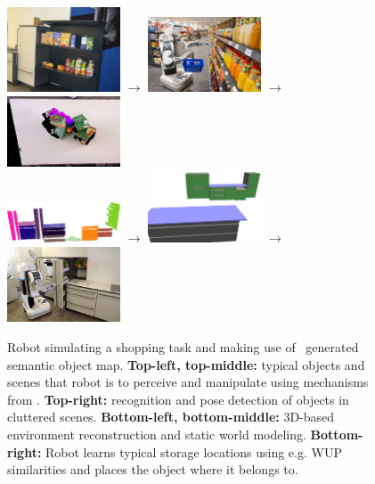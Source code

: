 \begin{figure}
  \begin{centering}
    \includegraphics[width=0.3\textwidth]
    {figures/storage_rack.JPG}
    {\large$\rightarrow$}
    \includegraphics[width=0.3\textwidth]
    {figures/pr2_edeka_basket_1.jpg}
    {\large$\rightarrow$}
    \includegraphics[width=0.3\textwidth]
    {figures/clutter-objects.png} \\
    \vspace{2ex}
    \includegraphics[width=0.3\textwidth]
    {figures/all_segmented.png}
    {\large$\rightarrow$}
    \includegraphics[width=0.3\textwidth]{figures/xml_map.png}
    {\large$\rightarrow$}
    \includegraphics[width=0.3\textwidth]
    {figures/pr2_highdrawer.jpg}
  \end{centering}
  \caption{Robot simulating a shopping task and making use of \ksem\ generated semantic object map. \textbf{Top-left, top-middle:} 
    typical objects and scenes that robot is to perceive and manipulate using mechanisms from \ksem. 
    \textbf{Top-right:} recognition and pose detection of objects in cluttered scenes. \textbf{Bottom-left, bottom-middle:} 
  3D-based environment reconstruction and static world modeling. \textbf{Bottom-right:} Robot learns typical storage locations
using e.g. WUP~\cite{wup} similarities and places the object where it belongs to.}
  \label{fig:teaser}
\end{figure}

